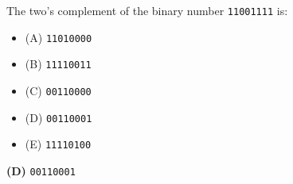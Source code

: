 

The two's complement of the binary number {\tt 11001111} is:

\begin{itemize}
\item{(A)} {\tt 11010000}
\vskip 5pt 
\item{(B)} {\tt 11110011}
\vskip 5pt 
\item{(C)} {\tt 00110000}
\vskip 5pt 
\item{(D)} {\tt 00110001}
\vskip 5pt 
\item{(E)} {\tt 11110100}
\end{itemize}







{\bf (D)} {\tt 00110001}
 










